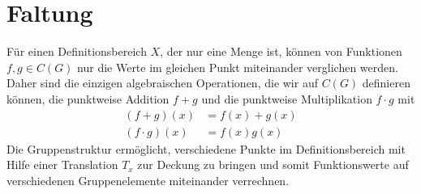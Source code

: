 %
%
%
\section{Faltung
\label{buch:gruppen:section:faltung}}
Für einen Definitionsbereich $X$, der nur eine Menge ist, können
von Funktionen $f,g\in C(G)$ nur die Werte im gleichen Punkt
miteinander verglichen werden. 
Daher sind die einzigen algebraischen Operationen, die wir auf
$C(G)$ definieren können, die punktweise Addition $f+g$ und 
die punktweise Multiplikation $f\cdot g$ mit
\begin{align*}
(f+g)(x)      &= f(x)+g(x) \\
(f\cdot g)(x) &= f(x) g(x)
\end{align*}
Die Gruppenstruktur ermöglicht, verschiedene Punkte im Definitionsbereich
mit Hilfe einer Translation $T_x$ zur Deckung zu bringen und somit
Funktionswerte auf verschiedenen Gruppenelemente miteinander verrechnen.

%
% 

